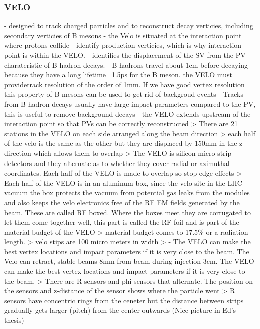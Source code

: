 \subsubsection{VELO}
- designed to track charged particles and to reconstruct decay verticies, including secondary verticies of B mesons
- the Velo is situated at the interaction point where protons collide
- identify production verticies, which is why interaction point is within the VELO.
- identifies the displacement of the SV from the PV - charateristic of B hadron decays.
- B hadrons travel about 1cm before decaying because they have a long lifetime ~1.5ps for the B meson. the VELO must providetrack resolution of the order of 1mm. If we have good vertex resolution this property of B mesons can be used to get rid of backgroud events
- Tracks from B hadron decays usually have large impact parameters compared to the PV, this is useful to remove background decays
- the VELO extends upstream of the interaction point so that PVs can be correctly reconstructed
> There are 21 stations in the VELO on each side arranged along the beam direction
> each half of the velo is the same as the other but they are displaced by 150mm in the z direction which allows them to overlap
> The VELO is silicon micro-strip detectors and they alternate as to whether they cover radial or azimuthal coordinates. Each half of the VELO is made to overlap so stop edge effects
> Each half of the VELO is in an aluminum box, since the velo site in the LHC vacuum the box protects the vacuum from potential gas leaks from the modules and also keeps the velo electronics free of the RF EM fields generated by the beam. These are called RF boxed. Where the boxes meet they are corrugated to let them come together well, this part is called the RF foil and is part of the material budget of the VELO
> material budget comes to 17.5\% or a radiation length.
> velo stips are 100 micro meters in width
> - The VELO can make the best vertex locations and impact parameters if it is very close to the beam. The Velo can retract, stable beams 8mm from beam during injection 3cm. The VELO can make the best vertex locations and impact parameters if it is very close to the beam.
> There are R-sensors and phi-sensors that alternate. The position on the sensors and z-distance of the sensor shows where the particle went
> R sensors have concentric rings from the ceneter but the distance between strips gradually gets larger (pitch) from the center outwards (Nice picture in Ed's thesis)
